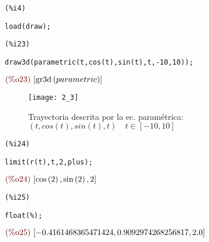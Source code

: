 \documentclass[12pt]{article}
\begin{document}
\noindent
\begin{minipage}[t]{8ex}{\color{red}\bf
\begin{verbatim}
(%i4) 
\end{verbatim}}
\end{minipage}
\begin{minipage}[t]{\textwidth}{\color{blue}
\begin{verbatim}
load(draw);
\end{verbatim}}
\end{minipage}

\noindent
\begin{minipage}[t]{8ex}{\color{red}\bf
\begin{verbatim}
(%i23) 
\end{verbatim}}
\end{minipage}
\begin{minipage}[t]{\textwidth}{\color{blue}
\begin{verbatim}
draw3d(parametric(t,cos(t),sin(t),t,-10,10));
\end{verbatim}}
\end{minipage}
\begin{math}\displaystyle
\parbox{8ex}{\color{labelcolor}(\%o23) }
[\mathrm{gr3d}\left( parametric\right) ]
\end{math}

\begin{figure}[H]
\centering
\texttt{[image: 2\_3]}
\caption{Trayectoria descrita por la ec. paramétrica: $(t,cos(t),sin(t),t) \quad t\in[-10,10]$}
\end{figure}

\noindent
\begin{minipage}[t]{8ex}{\color{red}\bf
\begin{verbatim}
(%i24) 
\end{verbatim}}
\end{minipage}
\begin{minipage}[t]{\textwidth}{\color{blue}
\begin{verbatim}
limit(r(t),t,2,plus);
\end{verbatim}}
\end{minipage}
\begin{math}\displaystyle
\parbox{8ex}{\color{labelcolor}(\%o24) }
[\mathrm{cos}\left( 2\right) ,\mathrm{sin}\left( 2\right) ,2]
\end{math}

\noindent
\begin{minipage}[t]{8ex}{\color{red}\bf
\begin{verbatim}
(%i25) 
\end{verbatim}}
\end{minipage}
\begin{minipage}[t]{\textwidth}{\color{blue}
\begin{verbatim}
float(%);
\end{verbatim}}
\end{minipage}
\begin{math}\displaystyle
\parbox{8ex}{\color{labelcolor}(\%o25) }
[-0.4161468365471424,0.9092974268256817,2.0]
\end{math}
\end{document}
